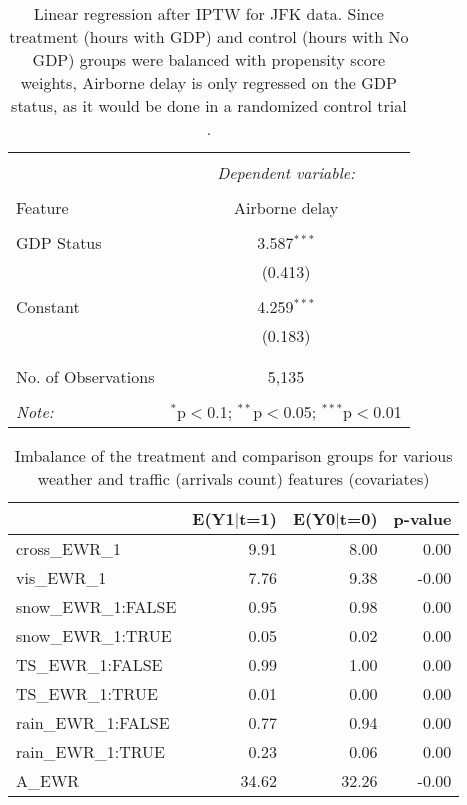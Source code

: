 \documentclass[11pt]{scrartcl}
\begin{document}
\begin{table}[!htbp] \centering 
  \caption{Linear regression after IPTW for JFK data.  Since treatment (hours with GDP) and control (hours with No GDP) groups were balanced with propensity score weights, Airborne delay is only regressed on the GDP status, as it would be done in a randomized control trial \cite{austin2011introduction}.} 
  \label{} 
\begin{tabular}{@{\extracolsep{5pt}}lc} 
\\[-1.8ex]\hline 
\hline \\[-1.8ex] 
 & \multicolumn{1}{c}{\textit{Dependent variable:}} \\ 
\cline{2-2} 
\\[-1.8ex] Feature & Airborne delay \\ 
\hline \\[-1.8ex] 
 GDP Status & 3.587$^{***}$ \\ 
  & (0.413) \\ 
  & \\ 
 Constant & 4.259$^{***}$ \\ 
  & (0.183) \\ 
  & \\ 
\hline \\[-1.8ex] 
No. of Observations & 5,135 \\ 
\hline 
\hline \\[-1.8ex] 
\textit{Note:}  & \multicolumn{1}{r}{$^{*}$p$<$0.1; $^{**}$p$<$0.05; $^{***}$p$<$0.01} \\ 
\end{tabular} 
\end{table} 


\begin{table}[ht]
\centering
\begin{tabular}{lrrr}
  \hline
 & E(Y1$|$t=1) & E(Y0$|$t=0) & p-value \\ 
  \hline
cross\_EWR\_1 & 9.91 & 8.00 & 0.00 \\ 
  vis\_EWR\_1 & 7.76 & 9.38 & -0.00 \\ 
  snow\_EWR\_1:FALSE & 0.95 & 0.98 & 0.00 \\ 
  snow\_EWR\_1:TRUE & 0.05 & 0.02 & 0.00 \\ 
  TS\_EWR\_1:FALSE & 0.99 & 1.00 & 0.00 \\ 
  TS\_EWR\_1:TRUE & 0.01 & 0.00 & 0.00 \\ 
  rain\_EWR\_1:FALSE & 0.77 & 0.94 & 0.00 \\ 
  rain\_EWR\_1:TRUE & 0.23 & 0.06 & 0.00 \\ 
  A\_EWR & 34.62 & 32.26 & -0.00 \\ 
   \hline
\end{tabular}
\caption{Imbalance of the treatment and comparison groups for various weather and traffic (arrivals count) features (covariates)} 
\label{tab:imbalance}
\end{table}
\end{document}
